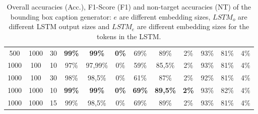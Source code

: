 \begin{table}[ht]
\begin{tabular}{ccc|ccc|ccc|ccc}
        {500}  & {1000}   & {30}     & \textbf{99\%}                       & \textbf{99\%}                       & \textbf{0\%}                             & {69\%}        & {89\%}          & {2\%}        & {93\%}        & {81\%}        & {4\%}        \\
        {1000} & {100}    & {10}     & {97\%}                              & {97,99\%}                           & {0\%}                                    & {59\%}        & {85,5\%}        & {2\%}        & {93\%}        & {81\%}        & {4\%}        \\
        {1000} & {100}    & {30}     & {98\%}                              & {98,5\%}                            & {0\%}                                    & {61\%}        & {87\%}          & {2\%}        & {92\%}        & {81\%}        & {4\%}        \\
        {1000} & {1000}   & {10}     & \textbf{99\%}                       & \textbf{99\%}                       & \textbf{0\%}                             & \textbf{69\%} & \textbf{89,5\%} & \textbf{2\%} & {93\%}        & {82\%}        & {4\%}        \\
        {1000} & {1000}   & {15}     & {99\%}                              & {98,5\%}                            & {0\%}                                    & {69\%}        & {89\%}          & {2\%}        & {93\%}        & {81\%}        & {4\%}        \\
        \bottomrule
    \end{tabular}
    \caption{Overall accuracies (Acc.), F1-Score (F1) and non-target accuracies (NT) of the bounding box caption generator: $e$ are different embedding sizes, $LSTM_o$ are different LSTM output sizes and $LSTM_e$ are different embedding sizes for the tokens in the LSTM.}
    \label{tab:results_bounding-box-caption-generator}
\end{table}

